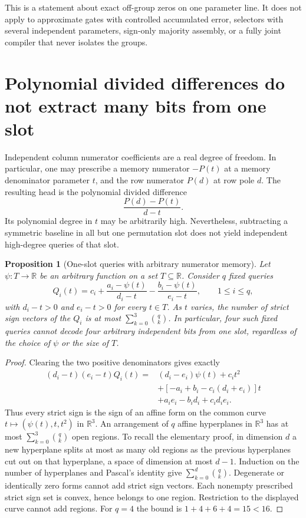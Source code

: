 \documentclass[11pt]{article}
\newtheorem{proposition}{Proposition}
\begin{document}
This is a statement about exact off-group zeros on one parameter line.
It does not apply to approximate gates with controlled accumulated error,
selectors with several independent parameters, sign-only majority
assembly, or a fully joint compiler that never isolates the groups.

\section{Polynomial divided differences do not extract many bits from one slot}

Independent column numerator coefficients are a real degree of freedom.
In particular, one may prescribe a memory numerator $-P(t)$ at a memory
denominator parameter $t$, and the row numerator $P(d)$ at row pole $d$.
The resulting head is the polynomial divided difference
\[
 \frac{P(d)-P(t)}{d-t}.
\]
Its polynomial degree in $t$ may be arbitrarily high. Nevertheless,
subtracting a symmetric baseline in all but one permutation slot does
not yield independent high-degree queries of that slot.

\begin{proposition}[One-slot queries with arbitrary numerator memory]
Let $\psi:T\to\mathbb R$ be an arbitrary function on a set $T\subseteq
\mathbb R$. Consider $q$ fixed queries
\[
 Q_i(t)=c_i+\frac{a_i-\psi(t)}{d_i-t}
              -\frac{b_i-\psi(t)}{e_i-t},
 \qquad 1\leq i\leq q,
\]
with $d_i-t>0$ and $e_i-t>0$ for every $t\in T$.
As $t$ varies, the number of strict sign vectors of the $Q_i$ is at most
$\sum_{k=0}^3\binom qk$. In particular, four such fixed queries cannot
decode four arbitrary independent bits from one slot, regardless of the
choice of $\psi$ or the size of $T$.
\end{proposition}
\begin{proof}
Clearing the two positive denominators gives exactly
\[
\begin{split}
 (d_i-t)(e_i-t)Q_i(t)
 ={}&(d_i-e_i)\psi(t)+c_i t^2\\
 &+[-a_i+b_i-c_i(d_i+e_i)]t\\
 &+a_i e_i-b_i d_i+c_i d_i e_i.
\end{split}
\]
Thus every strict sign is the sign of an affine form on the common
curve $t\mapsto(\psi(t),t,t^2)$ in $\mathbb R^3$. An arrangement of
$q$ affine hyperplanes in $\mathbb R^3$ has at most
$\sum_{k=0}^3\binom qk$ open regions. To recall the elementary proof,
in dimension $d$ a new hyperplane splits at most as many old regions
as the previous hyperplanes cut out on that hyperplane, a space of
dimension at most $d-1$. Induction on the number of hyperplanes and
Pascal's identity give $\sum_{k=0}^d\binom qk$. Degenerate or identically
zero forms cannot add strict sign vectors. Each nonempty prescribed
strict sign set is convex, hence belongs to one region. Restriction
to the displayed curve cannot add regions.
For $q=4$ the bound is $1+4+6+4=15<16$.
\end{proof}
\end{document}

